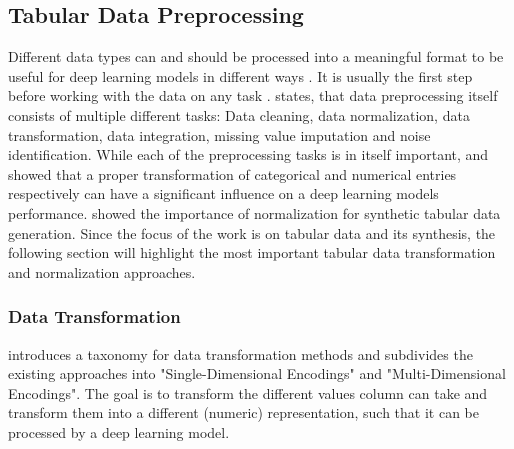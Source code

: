 \subsection{Tabular Data Preprocessing}
\label{sec:preprocessing}

Different data types can and should be processed into a meaningful format to be useful for deep learning \glspl{model} in different ways \cite{fan2020RelationalDataSynthesisa, lederrey2022DATGANIntegratingExperta}.
It is usually the first step before working with the data on any task \cite{izonin2022TwoStepDataNormalization}.
\cite{garcia2016BigDataPreprocessing} states, that data preprocessing itself consists of multiple different tasks: Data cleaning, data normalization, data transformation, data integration, missing value imputation and noise identification.
While each of the preprocessing tasks is in itself important, 
\cite{fitkov-norris2012EvaluatingImpactCategorical} and \cite{gorishniy2022EmbeddingsNumericalFeatures} showed that a proper transformation of categorical and numerical entries respectively can have a significant influence on a deep learning \glspl{model} performance.
\cite{xu2019ModelingTabularData} showed the importance of normalization for synthetic tabular data generation.
Since the focus of the work is on tabular data and its synthesis, the following section will highlight the most important tabular data transformation and normalization approaches.

\subsubsection{Data Transformation}
\label{sec:dataTransformation}

\cite{borisov2022DeepNeuralNetworks} introduces a taxonomy for data transformation methods and subdivides the existing approaches into "Single-Dimensional Encodings" and "Multi-Dimensional Encodings".
The goal is to transform the different values column can take and transform them into a different (numeric) representation, such that it can be processed by a deep learning \gls{model}.

